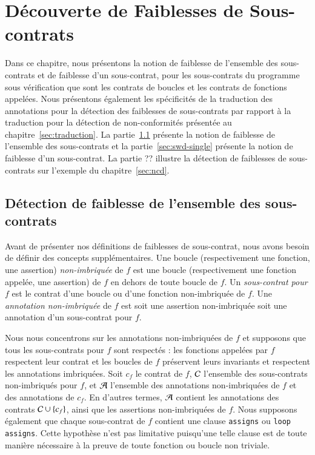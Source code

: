 
\chapter{Découverte de Faiblesses de Sous-contrats}
\label{sec:swd}

\chapterintro

Dans ce chapitre, nous présentons la notion de faiblesse de l'ensemble des
sous-contrats et de faiblesse d'un sous-contrat, pour les sous-contrats du
programme sous vérification que sont les contrats de boucles et les contrats
de fonctions appelées.
Nous présentons également les spécificités de la traduction des annotations pour
la détection des faiblesses de sous-contrats par rapport à la traduction pour la
détection de non-conformités présentée au chapitre~\ref{sec:traduction}.
La partie~\ref{sec:swd-global} présente la notion de faiblesse de l'ensemble des
sous-contrats et la partie~\ref{sec:swd-single} présente la notion de faiblesse
d'un sous-contrat.
La partie ?? illustre la détection de faiblesses de sous-contrats sur l'exemple
du chapitre~\ref{sec:ncd}.


\section{Détection de faiblesse de l'ensemble des sous-contrats}
\label{sec:swd-global}


Avant de présenter nos définitions de faiblesses de sous-contrat, nous avons
besoin de définir des concepts supplémentaires.
Une boucle (respectivement une fonction, une assertion) \emph{non-imbriquée} de
$f$ est une boucle (respectivement une fonction appelée, une assertion) de $f$
en dehors de toute boucle de $f$.
Un \emph{sous-contrat pour $f$} est le contrat d'une boucle ou d'une fonction
non-imbriquée de $f$.
Une \emph{annotation non-imbriquée} de $f$ est soit une assertion non-imbriquée
soit une annotation d'un sous-contrat pour $f$.

Nous nous concentrons sur les annotations non-imbriquées de $f$ et supposons que
tous les sous-contrats pour $f$ sont respectés : les fonctions appelées par $f$
respectent leur contrat et les boucles de $f$ préservent leurs invariants et
respectent les annotations imbriquées.
Soit $c_f$ le contrat de $f$, ${\mathcal{C}}$ l'ensemble des sous-contrats non-imbriqués
pour $f$, et ${\mathcal{A}}$ l'ensemble des annotations non-imbriquées de $f$ et des
annotations de $c_f$.
En d'autres termes, ${\mathcal{A}}$ contient les annotations des contrats ${\mathcal{C}}\cup\{c_f\}$,
ainsi que les assertions non-imbriquées de $f$.
Nous supposons également que chaque sous-contrat de $f$ contient une clause
\lstinline'assigns' ou \lstinline'loop assigns'.
Cette hypothèse n'est pas limitative puisqu'une telle clause est de toute
manière nécessaire à la preuve de toute fonction ou boucle non triviale.


